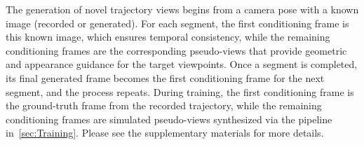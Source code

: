 The generation of novel trajectory views begins from a camera pose with a known image (recorded or generated). For each segment, the first conditioning frame is this known image, which ensures temporal consistency, while the remaining conditioning frames are the corresponding pseudo-views that provide geometric and appearance guidance for the target viewpoints. Once a segment is completed, its final generated frame becomes the first conditioning frame for the next segment, and the process repeats.
During training, the first conditioning frame is the ground-truth frame from the recorded trajectory, while the remaining conditioning frames are simulated pseudo-views synthesized via the pipeline in~\cref{sec:Training}. Please see the supplementary materials for more details.




